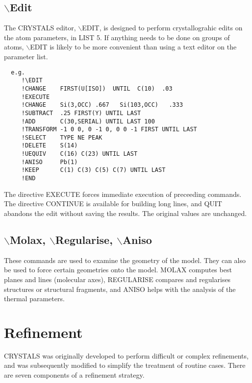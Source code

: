 \documentclass[10pt,a4paper]{report}
\begin{document}
\section{$\backslash$Edit}


The CRYSTALS editor, $\backslash$EDIT, is designed to perform crystallograhic
 edits on the atom parameters, in LIST 5. If anything needs to be done
 on groups of atoms, $\backslash$EDIT is likely to be more convenient than using a text
 editor on the parameter list.

\small\begin{verbatim}
  e.g.
     !\EDIT
     !CHANGE    FIRST(U[ISO])  UNTIL  C(10)  .03
     !EXECUTE
     !CHANGE    Si(3,OCC) .667   Si(103,OCC)   .333
     !SUBTRACT  .25 FIRST(Y) UNTIL LAST
     !ADD       C(30,SERIAL) UNTIL LAST 100
     !TRANSFORM -1 0 0, 0 -1 0, 0 0 -1 FIRST UNTIL LAST
     !SELECT    TYPE NE PEAK
     !DELETE    S(14)
     !UEQUIV    C(16) C(23) UNTIL LAST
     !ANISO     Pb(1)
     !KEEP      C(1) C(3) C(5) C(7) UNTIL LAST
     !END
\end{verbatim}\normalsize




The directive EXECUTE forces immediate execution of preceeding commands. The
 directive CONTINUE is available for building long lines, and QUIT abandons
 the edit without saving the results. The original values are unchanged.




\section{$\backslash$Molax, $\backslash$Regularise, $\backslash$Aniso}


These commands are used to examine the geometry of the model. They can
 also be used to force certain geometries onto the model. MOLAX computes
 best planes and lines (molecular axes), REGULARISE compares and
 regularises structures or structural fragments,
 and ANISO  helps with the analysis of the thermal
 parameters.




\chapter{Refinement}


CRYSTALS was originally developed to perform difficult or complex refinements, and was subsequently modified to simplify the treatment of routine cases. There are seven components of a refinement strategy.
\end{document}

